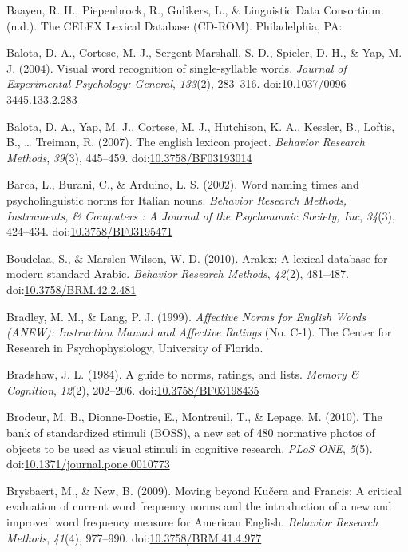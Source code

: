\documentclass[english,man]{apa6}
\theoremstyle{definition}
\theoremstyle{definition}
\theoremstyle{definition}
\theoremstyle{remark}
\begin{document}
\hypertarget{ref-Baayen}{}
Baayen, R. H., Piepenbrock, R., Gulikers, L., \& Linguistic Data
Consortium. (n.d.). The CELEX Lexical Database (CD-ROM). Philadelphia,
PA:

\hypertarget{ref-Balota2004}{}
Balota, D. A., Cortese, M. J., Sergent-Marshall, S. D., Spieler, D. H.,
\& Yap, M. J. (2004). Visual word recognition of single-syllable words.
\emph{Journal of Experimental Psychology: General}, \emph{133}(2),
283--316.
doi:\href{https://doi.org/10.1037/0096-3445.133.2.283}{10.1037/0096-3445.133.2.283}

\hypertarget{ref-Balota2007}{}
Balota, D. A., Yap, M. J., Cortese, M. J., Hutchison, K. A., Kessler,
B., Loftis, B., \ldots{} Treiman, R. (2007). The english lexicon
project. \emph{Behavior Research Methods}, \emph{39}(3), 445--459.
doi:\href{https://doi.org/10.3758/BF03193014}{10.3758/BF03193014}

\hypertarget{ref-Barca2002}{}
Barca, L., Burani, C., \& Arduino, L. S. (2002). Word naming times and
psycholinguistic norms for Italian nouns. \emph{Behavior Research
Methods, Instruments, \& Computers : A Journal of the Psychonomic
Society, Inc}, \emph{34}(3), 424--434.
doi:\href{https://doi.org/10.3758/BF03195471}{10.3758/BF03195471}

\hypertarget{ref-Boudelaa2010}{}
Boudelaa, S., \& Marslen-Wilson, W. D. (2010). Aralex: A lexical
database for modern standard Arabic. \emph{Behavior Research Methods},
\emph{42}(2), 481--487.
doi:\href{https://doi.org/10.3758/BRM.42.2.481}{10.3758/BRM.42.2.481}

\hypertarget{ref-Bradley1999}{}
Bradley, M. M., \& Lang, P. J. (1999). \emph{Affective Norms for English
Words (ANEW): Instruction Manual and Affective Ratings} (No. C-1). The
Center for Research in Psychophysiology, University of Florida.

\hypertarget{ref-Bradshaw1984}{}
Bradshaw, J. L. (1984). A guide to norms, ratings, and lists.
\emph{Memory \& Cognition}, \emph{12}(2), 202--206.
doi:\href{https://doi.org/10.3758/BF03198435}{10.3758/BF03198435}

\hypertarget{ref-Brodeur2010}{}
Brodeur, M. B., Dionne-Dostie, E., Montreuil, T., \& Lepage, M. (2010).
The bank of standardized stimuli (BOSS), a new set of 480 normative
photos of objects to be used as visual stimuli in cognitive research.
\emph{PLoS ONE}, \emph{5}(5).
doi:\href{https://doi.org/10.1371/journal.pone.0010773}{10.1371/journal.pone.0010773}

\hypertarget{ref-Brysbaert2009}{}
Brysbaert, M., \& New, B. (2009). Moving beyond Kučera and Francis: A
critical evaluation of current word frequency norms and the introduction
of a new and improved word frequency measure for American English.
\emph{Behavior Research Methods}, \emph{41}(4), 977--990.
doi:\href{https://doi.org/10.3758/BRM.41.4.977}{10.3758/BRM.41.4.977}
\end{document}
